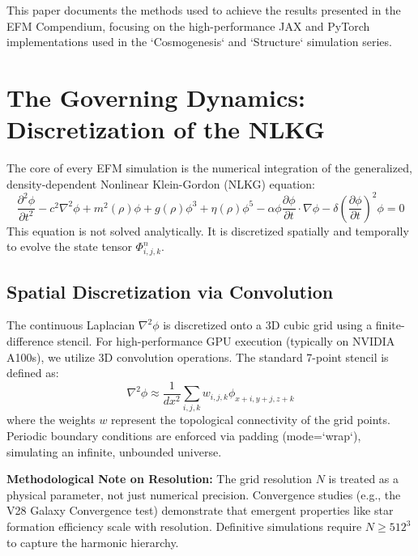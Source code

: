 \documentclass[11pt, twoside]{article}
\begin{document}
This paper documents the methods used to achieve the results presented in the EFM Compendium, focusing on the high-performance JAX and PyTorch implementations used in the `Cosmogenesis` and `Structure` simulation series.

\section{The Governing Dynamics: Discretization of the NLKG}

The core of every EFM simulation is the numerical integration of the generalized, density-dependent Nonlinear Klein-Gordon (NLKG) equation:
\begin{equation}
\frac{\partial^2\phi}{\partial t^2} - c^2\nabla^2\phi + m^2(\rho)\phi + g(\rho)\phi^3 + \eta(\rho)\phi^5 - \alpha\phi\frac{\partial\phi}{\partial t}\cdot\nabla\phi - \delta\left(\frac{\partial\phi}{\partial t}\right)^2\phi = 0
\end{equation}
This equation is not solved analytically. It is discretized spatially and temporally to evolve the state tensor $\Phi_{i,j,k}^n$.

\subsection{Spatial Discretization via Convolution}
The continuous Laplacian $\nabla^2\phi$ is discretized onto a 3D cubic grid using a finite-difference stencil. For high-performance GPU execution (typically on NVIDIA A100s), we utilize 3D convolution operations. The standard 7-point stencil is defined as:
\begin{equation}
\nabla^2\phi \approx \frac{1}{dx^2} \sum_{i,j,k} w_{i,j,k} \phi_{x+i, y+j, z+k}
\end{equation}
where the weights $w$ represent the topological connectivity of the grid points. Periodic boundary conditions are enforced via padding (mode=`wrap`), simulating an infinite, unbounded universe.

\textbf{Methodological Note on Resolution:} The grid resolution $N$ is treated as a physical parameter, not just numerical precision. Convergence studies (e.g., the V28 Galaxy Convergence test) demonstrate that emergent properties like star formation efficiency scale with resolution. Definitive simulations require $N \ge 512^3$ to capture the harmonic hierarchy.
\end{document}
